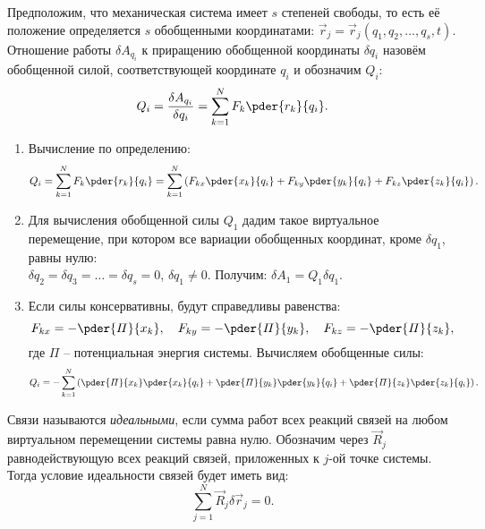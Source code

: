 
Предположим, что механическая система имеет \( s \) степеней свободы, то есть её
положение определяется \( s \) обобщенными координатами:
\( \vec{r}_j = \vec{r}_j(q_1, q_2, \ldots, q_s, t) \). Отношение работы
\( \delta A_{q_i} \) к приращению обобщенной координаты \( \delta q_i \) назовём
обобщенной силой, соответствующей координате \( q_i \) и обозначим \( Q_i \):
\[
    Q_i = \frac{\delta A_{q_i}}{\delta q_i} = \sum_{k=1}^N F_k\pder{r_k}{q_i}.
\]

\begin{enumerate}
    \item Вычисление по определению:
    \[
        Q_i = \sum_{k=1}^N F_k\pder{r_k}{q_i} = \sum_{k=1}^N \left(F_{kx}
        \pder{x_k}{q_i} + F_{ky}\pder{y_k}{q_i} + F_{kz}\pder{z_k}{q_i}\right).
    \]
    
    \item Для вычисления обобщенной силы \( Q_1 \) дадим такое виртуальное
    перемещение, при котором все вариации обобщенных координат, кроме
    \( \delta q_1 \), равны нулю:\\
    \( \delta q_2 = \delta q_3 = \ldots = \delta q_s = 0 \),
    \( \delta q_1 \ne 0 \). Получим: \( \delta A_1 = Q_1\delta q_1 \).
    
    \item Если силы консервативны, будут справедливы равенства:
    \[
        F_{kx} = -\pder{\varPi}{x_k}, \quad F_{ky} = -\pder{\varPi}{y_k}, \quad
        F_{kz} = -\pder{\varPi}{z_k},
    \]
    где \( \varPi \) -- потенциальная энергия системы. Вычисляем обобщенные силы:
    \[
        Q_i = -\sum_{k=1}^N \left(\pder{\varPi}{x_k}\pder{x_k}{q_i} +
        \pder{\varPi}{y_k}\pder{y_k}{q_i} + \pder{\varPi}{z_k}\pder{z_k}{q_i}
        \right).
    \]
\end{enumerate}

Связи называются \emph{идеальными}, если сумма работ всех реакций связей на
любом виртуальном перемещении системы равна нулю. Обозначим через
\( \vec{R}_j \) равнодействующую всех реакций связей, приложенных к
\( j \)-ой точке системы. Тогда условие идеальности связей будет иметь вид:
\[
    \sum_{j=1}^N \vec{R}_j\delta\vec{r}_j = 0.
\]

\newpage
